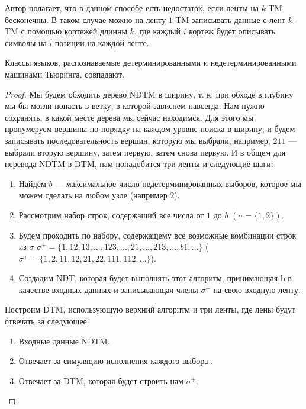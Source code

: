     \begin{Rem}
        Автор полагает, что в данном способе есть недостаток, если ленты на $k$-TM бесконечны. В таком случае можно на ленту $1$-TM записывать данные с лент $k$-TM с помощью кортежей длинны $k$, где каждый $i$ кортеж будет описывать символы на $i$ позиции на каждой ленте.
    \end{Rem}
    \begin{Thm}
    Классы языков, распознаваемые детерминированными и недетерминированными машинами Тьюринга, совпадают.
    \end{Thm}
    \begin{proof}
        \par Мы будем обходить дерево NDTM в ширину, т. к. при обходе в глубину мы бы могли попасть в ветку, в которой зависнем навсегда. Нам нужно сохранять, в какой месте дерева мы сейчас находимся. Для этого мы пронумеруем вершины по порядку на каждом уровне поиска в ширину, и будем записывать последовательность вершин, которую мы выбрали, например, $211$ --- выбрали вторую вершину, затем первую, затем снова первую. И в общем для перевода NDTM в  DTM, нам понадобится три ленты и следующие шаги:
        \begin{enumerate}
            \item Найдём $b$ --- максимальное число недетерминированных выборов, которое мы можем сделать на любом узле (например $2$).
            \item Рассмотрим набор строк, содержащий все числа от $1$ до $b$ $(\sigma = \{1, 2\})$.
            \item Будем проходить по набору, содержащему все возможные комбинации строк из $\sigma$ $\sigma^+ = \{1, 12, 13, ..., 123, ..., 21, ..., 213, ..., b1, ...\}$ ($\sigma^+ = \{1, 2, 11, 12, 21, 22, 111, 112, ...\}$).
            \item Создадим NDT, которая будет выполнять этот алгоритм, принимающая b в качестве входных данных и записывающая члены $\sigma^+$ на свою входную ленту.
        \end{enumerate}
        \par Построим DTM, использующую верхний алгоритм и три ленты, где лены будут отвечать за следующее:
        \begin{enumerate}
            \item Входные данные NDTM.
            \item Отвечает за симуляцию исполнения каждого выбора .
            \item Отвечает за DTM, которая будет строить нам $\sigma^+$.
        \end{enumerate}


\end{proof}
